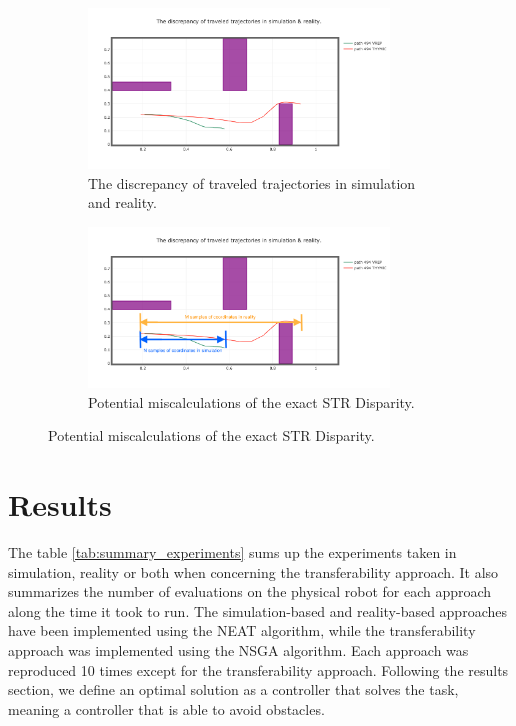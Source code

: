 \begin{figure}[H]
    \centering
    \begin{subfigure}[b]{0.8\textwidth}
    	\centering
        \includegraphics[width=8cm]{include/images/trajectory_discrepancy.PNG}
        \caption{The discrepancy of traveled trajectories in simulation and reality.}
        \label{fig:trajectory_discrepancy}
    \end{subfigure}
    \begin{subfigure}[b]{0.8\textwidth}
    	\centering
        \includegraphics[width=8cm]{include/images/trajectory_discrepancy_wrong_measure.PNG}
        \caption{Potential miscalculations of the exact STR Disparity.}
        \label{fig:trajectory_discrepancy_wrong_measure}
    \end{subfigure}
	\label{fig:real_based_resultsI}
\end{figure}


\section{Results}

The table \ref{tab:summary_experiments} sums up the experiments taken in simulation, reality or both when concerning the transferability approach. It also summarizes the number of evaluations on the physical robot for each approach along the time it took to run. The simulation-based and reality-based approaches have been implemented using the NEAT algorithm, while the transferability approach was implemented using the NSGA algorithm. Each approach was reproduced 10 times except for the transferability approach. Following the results section, we define an optimal solution as a controller that solves the task, meaning a controller that is able to avoid obstacles.


